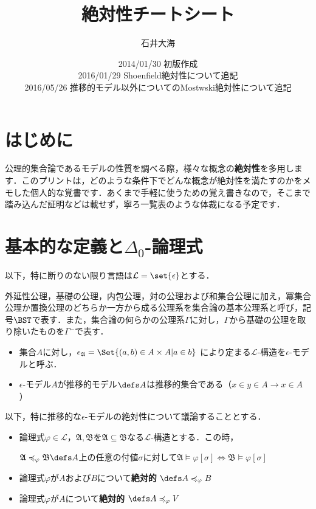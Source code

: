 \documentclass[a4j]{ltjsarticle}
\title{絶対性チートシート}
\author{石井大海}
\date{2014/01/30 初版作成\\ %
2016/01/29 Shoenfield絶対性について追記\\ %
2016/05/26 推移的モデル以外についてのMostwski絶対性について追記}
\begin{document}
\maketitle

\section{はじめに}
公理的集合論であるモデルの性質を調べる際，様々な概念の{\bfseries 絶対性}を多用します．このプリントは，どのような条件下でどんな概念が絶対性を満たすのかをメモした個人的な覚書です．あくまで手軽に使うための覚え書きなので，そこまで踏み込んだ証明などは載せず，寧ろ一覧表のような体裁になる予定です．

\section{基本的な定義と$\Delta_0$-論理式}
以下，特に断りのない限り言語は$\mathcal{L} = \set{\epsilon}$とする．

\begin{definition}
 外延性公理，基礎の公理，内包公理，対の公理および和集合公理に加え，冪集合公理か置換公理のどちらか一方から成る公理系を集合論の基本公理系と呼び，記号$\BST$で表す．また，集合論の何らかの公理系$\Gamma$に対し，$\Gamma$から基礎の公理を取り除いたものを$\Gamma^-$で表す．
\end{definition}

\begin{definition}
\begin{itemize}
 \item 集合$A$に対し，$\epsilon_{{\mathfrak{A}}} = \Set{ (a, b) \in A \times A | a \in b}$ により定まる$\mathcal{L}$-構造を$\epsilon$-モデルと呼ぶ．
 \item $\epsilon$-モデル$A$が推移的モデル$\defs A$は推移的集合である（$x \in y \in A \rightarrow x \in A$）
\end{itemize}
\end{definition}

以下，特に推移的な$\epsilon$-モデルの絶対性について議論することとする．

\begin{definition}[絶対性]
 \begin{itemize}
  \item 論理式$\varphi \in \mathcal{L}$，$\mathfrak{A}, \mathfrak{B}$を$\mathfrak{A} \subseteq \mathfrak{B}$なる$\mathcal{L}$-構造とする．この時，
	
	$\mathfrak{A} \preccurlyeq_\varphi \mathfrak{B} \defs A$上の任意の付値$\sigma$に対して$\mathfrak{A} \models \varphi[\sigma] \Leftrightarrow \mathfrak{B} \models \varphi[\sigma]$
  \item 論理式$\varphi$が$A$および$B$について{\bfseries 絶対的} $\defs A \preccurlyeq_\varphi B$
  \item 論理式$\varphi$が$A$について{\bfseries 絶対的} $\defs A \preccurlyeq_\varphi V$
 \end{itemize}
\end{definition}
\end{document}
